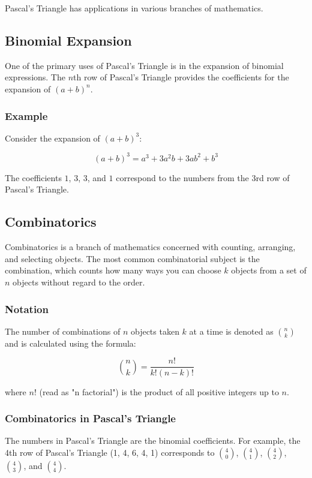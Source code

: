 \documentclass[12pt]{article}
\begin{document}
Pascal's Triangle has applications in various branches of mathematics.

\subsection*{Binomial Expansion}

One of the primary uses of Pascal's Triangle is in the expansion of binomial expressions. The \(n\)th row of Pascal's Triangle provides the coefficients for the expansion of \((a + b)^n\).

\subsubsection*{Example}

Consider the expansion of \((a + b)^3\):

\[
(a + b)^3 = a^3 + 3a^2b + 3ab^2 + b^3
\]

The coefficients \(1\), \(3\), \(3\), and \(1\) correspond to the numbers from the 3rd row of Pascal's Triangle.

\subsection*{Combinatorics}

Combinatorics is a branch of mathematics concerned with counting, arranging, and selecting objects. The most common combinatorial subject is the combination, which counts how many ways you can choose \(k\) objects from a set of \(n\) objects without regard to the order.

\subsubsection*{Notation}

The number of combinations of \(n\) objects taken \(k\) at a time is denoted as \(\binom{n}{k}\) and is calculated using the formula:

\[
\binom{n}{k} = \frac{n!}{k!(n-k)!}
\]

where \(n!\) (read as "n factorial") is the product of all positive integers up to \(n\).

\subsubsection*{Combinatorics in Pascal's Triangle}

The numbers in Pascal's Triangle are the binomial coefficients. For example, the 4th row of Pascal's Triangle (1, 4, 6, 4, 1) corresponds to \(\binom{4}{0}\), \(\binom{4}{1}\), \(\binom{4}{2}\), \(\binom{4}{3}\), and \(\binom{4}{4}\).
\end{document}
